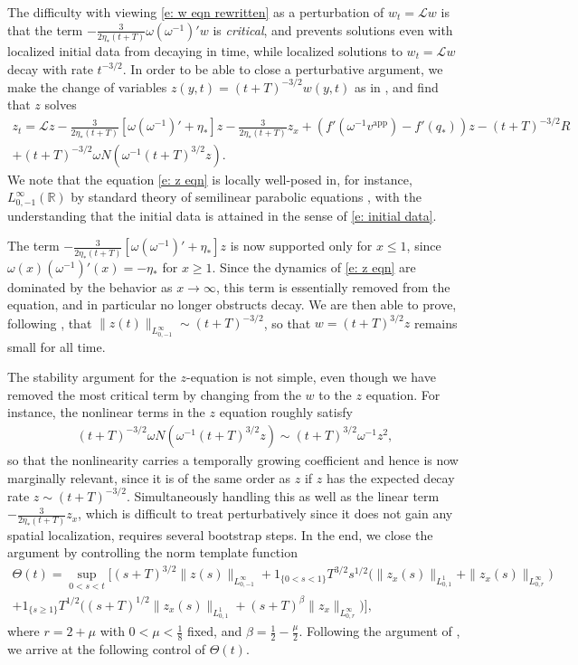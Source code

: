 \documentclass[11pt]{article}
\newcommand{\R}{\mathbb{R}}
\newcommand{\mcl}{\mathcal{L}}
\numberwithin{equation}{section}
\numberwithin{prop}{section}
\begin{document}
The difficulty with viewing \eqref{e: w eqn rewritten} as a perturbation of $w_t = \mcl w$ is that the term $-\frac{3}{2 \eta_* (t+T)} \omega (\omega^{-1})' w$ is \emph{critical}, and prevents solutions even with localized initial data from decaying in time, while localized solutions to $w_t = \mcl w$ decay with rate $t^{-3/2}$. In order to be able to close a perturbative argument, we make the change of variables $z (y,t) = (t+T)^{-3/2} w(y,t)$ as in \cite{CAMS}, and find that $z$ solves
\begin{multline}
	z_t = \mcl z - \frac{3}{2 \eta_* (t+T)} [\omega (\omega^{-1})' + \eta_*] z - \frac{3}{2 \eta_* (t+T)} z_x + (f'(\omega^{-1} v^\mathrm{app}) - f'(q_*))z- (t+T)^{-3/2} R \\ + (t+T)^{-3/2} \omega N (\omega^{-1} (t+T)^{3/2} z). \label{e: z eqn}
\end{multline}
We note that the equation \eqref{e: z eqn} is locally well-posed in, for instance, $L^\infty_{0,-1}(\R)$ by standard theory of semilinear parabolic equations \cite{Henry, Lunardi}, with the understanding that the initial data is attained in the sense of \eqref{e: initial data}. 

The term $-\frac{3}{2 \eta_* (t+T)} [\omega (\omega^{-1})' + \eta_*] z$ is now supported only for $x \leq 1$, since $\omega(x) (\omega^{-1})'(x) = - \eta_*$ for $x \geq 1$. Since the dynamics of \eqref{e: z eqn} are dominated by the behavior as $x \to \infty$, this term is essentially removed from the equation, and in particular no longer obstructs decay. We are then able to prove, following \cite[Section 5]{CAMS}, that $\| z(t) \|_{L^\infty_{0, -1}} \sim (t+T)^{-3/2}$, so that $w = (t+T)^{3/2} z$ remains small for all time. 

The stability argument for the $z$-equation is not simple, even though we have removed the most critical term by changing from the $w$ to the $z$ equation. For instance, the nonlinear terms in the $z$ equation roughly satisfy
\begin{align*}
	(t+T)^{-3/2} \omega N(\omega^{-1} (t+T)^{3/2} z ) \sim (t+T)^{3/2} \omega^{-1} z^2,
\end{align*}
so that the nonlinearity carries a temporally growing coefficient and hence is now marginally relevant, since it is of the same order as $z$ if $z$ has the expected decay rate $z \sim (t+T)^{-3/2}$. Simultaneously handling this as well as the linear term $-\frac{3}{2 \eta_*(t+T)} z_x$, which is difficult to treat perturbatively since it does not gain any spatial localization, requires several bootstrap steps. In the end, we close the argument by controlling the norm template function
\begin{multline}
\Theta(t) = \sup_{0 < s < t} \bigg[ (s+T)^{3/2} \| z(s) \|_{L^\infty_{0, -1}} + 1_{\{0< s < 1\}} T^{3/2} s^{1/2} \bigg(  \| z_x (s)\|_{L^1_{0,1}} + \| z_x (s) \|_{L^\infty_{0, r}} \bigg) \\ + 1_{\{s \geq 1\}} T^{1/2} \bigg( (s+T)^{1/2} \| z_x (s)\|_{L^1_{0,1}} + (s+T)^\beta \| z_x \|_{L^\infty_{0,r}} \bigg) \bigg],
\end{multline}
where $r = 2 + \mu$ with $ 0 < \mu < \frac{1}{8}$ fixed, and $\beta = \frac{1}{2} - \frac{\mu}{2}$. Following the argument of \cite{CAMS}, we arrive at the following control of $\Theta(t)$.
\end{document}

